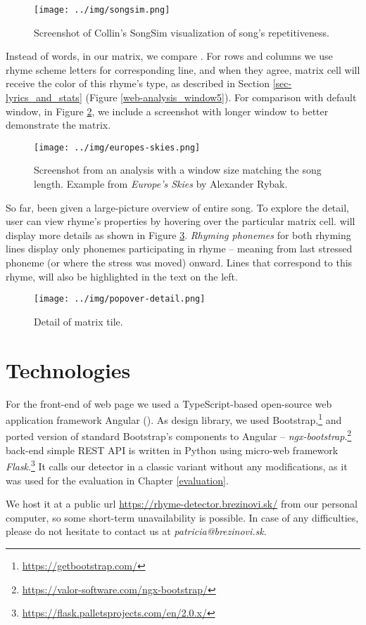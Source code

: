 \begin{figure}[h]\centering
	\texttt{[image: ../img/songsim.png]}
	\caption{Screenshot of Collin's SongSim visualization of song's repetitiveness.}
	\label{songsim}
\end{figure}

Instead of words, in our matrix, we compare . For rows and columns\added{,} we use rhyme scheme letters for  corresponding line, and when they agree,  matrix cell will receive the color of this rhyme's type, as described in Section \ref{sec-lyrics_and_stats} (Figure \ref{web-analysis_window5}). For comparison with  default window, in Figure \ref{web-analysis_window_all}, we include a screenshot with  longer window to better demonstrate the matrix.


\begin{figure}[!h]\centering
		\texttt{[image: ../img/europes-skies.png]}
	\caption[Screenshot from an analysis with a window size matching the song length.]{Screenshot from an analysis with a window size matching the song length. Example from \textit{Europe's Skies} by Alexander Rybak.}
	\label{web-analysis_window_all}
\end{figure}

So far,  been given a large-picture overview of  entire song. To explore the detail, user can view rhyme's properties by hovering over the particular matrix cell.  will display more details as shown in Figure \ref{web-popover}. \textit{Rhyming phonemes} for both rhyming lines display only phonemes participating in  rhyme -- meaning from  last stressed phoneme (or where the stress was moved) onward. Lines\deleted{,} that correspond to this rhyme, will also be highlighted in the text on the left. 

\begin{figure}[h]\centering
		\texttt{[image: ../img/popover-detail.png]}
	\caption{Detail of  matrix tile.}
	\label{web-popover}
\end{figure}


\section{Technologies}
For the front-end of  web page\added{,} we used a TypeScript-based open-source web application framework \deleted{-- }Angular (\cite{angular}). As  design library, we used Bootstrap,\footnote{\url{https://getbootstrap.com/}} and ported version
of standard Bootstrap's components to Angular -- \textit{ngx-bootstrap}.\footnote{\url{https://valor-software.com/ngx-bootstrap/}}  back-end simple REST API is written in Python using  micro-web framework \textit{Flask}.\footnote{\url{https://flask.palletsprojects.com/en/2.0.x/}} It calls our detector\deleted{,} in a classic variant without any modifications, as it was used for the evaluation in Chapter \ref{evaluation}. 

We host it at a public url \url{https://rhyme-detector.brezinovi.sk/} from our personal computer, so some short-term unavailability is possible. In case of any difficulties, please do not hesitate to contact us at \textit{patricia@brezinovi.sk}.
